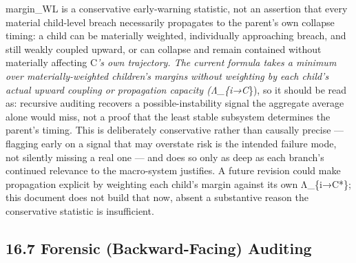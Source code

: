 \documentclass[
]{article}
\begin{document}
margin\_WL is a conservative early-warning statistic, not an assertion
that every material child-level breach necessarily propagates to the
parent's own collapse timing: a child can be materially weighted,
individually approaching breach, and still weakly coupled upward, or can
collapse and remain contained without materially affecting C\emph{'s own
trajectory. The current formula takes a minimum over materially-weighted
children's margins without weighting by each child's actual upward
coupling or propagation capacity (Λ\_\{i→C}\}), so it should be read as:
recursive auditing recovers a possible-instability signal the aggregate
average alone would miss, not a proof that the least stable subsystem
determines the parent's timing. This is deliberately conservative rather
than causally precise --- flagging early on a signal that may overstate
risk is the intended failure mode, not silently missing a real one ---
and does so only as deep as each branch's continued relevance to the
macro-system justifies. A future revision could make propagation
explicit by weighting each child's margin against its own Λ\_\{i→C*\};
this document does not build that now, absent a substantive reason the
conservative statistic is insufficient.

\hypertarget{forensic-backward-facing-auditing}{%
\subsection{16.7 Forensic (Backward-Facing)
Auditing}\label{forensic-backward-facing-auditing}}
\end{document}
